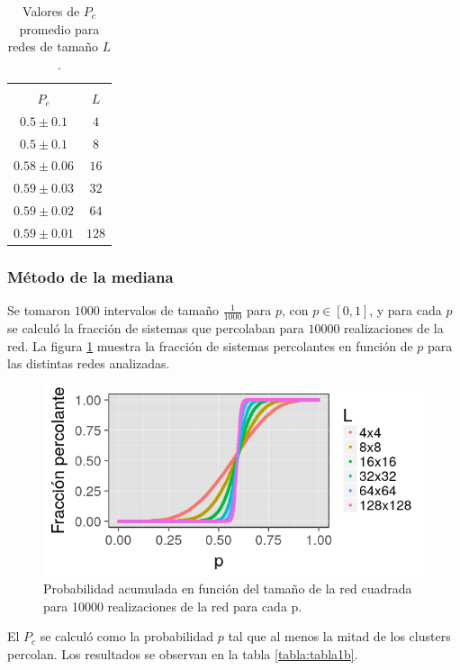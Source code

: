 \documentclass[%
 reprint,
 amsmath,amssymb,
 aps,
spanish]{revtex4-1}
\begin{document}
\begin{table}[h]
\caption{\label{tabla:tabla1a}Valores de $P_c$ promedio para redes de tamaño $L$.}
	\begin{tabular}{c|c}
		\hline
		\hline		
		\\[-5pt]
		$P_c$ & $L$ \\
		\hline
		$0.5\pm0.1$ & $4$ \\
		$0.5\pm0.1$ & $8$ \\
		$0.58\pm0.06$ & $16$ \\
		$0.59\pm0.03$ & $32$ \\
		$0.59\pm0.02$ & $64$ \\
		$0.59\pm0.01$ & $128$ \\															
	\end{tabular}
\end{table}

\subsubsection{Método de la mediana}
Se tomaron $1000$ intervalos de tamaño $\frac{1}{1000}$ para $p$, con $p \in [0, 1]$, y para cada $p$ se calculó la fracción de sistemas que percolaban para $10000$ realizaciones de la red. La figura \ref{fig:probabilidad_acumulada} muestra la fracción de sistemas percolantes en función de $p$ para las distintas redes analizadas. 
\begin{figure}[h!]
  \centering
  \includegraphics[width=.95\linewidth]{ej1b/probabilidad_acumulada}
\caption{Probabilidad acumulada en función del tamaño de la red cuadrada para 10000 realizaciones de la red para cada p.}
\label{fig:probabilidad_acumulada}
\end{figure}
El $P_c$ se calculó como la probabilidad $p$ tal que al menos la mitad de los clusters percolan. Los resultados se observan en la tabla \ref{tabla:tabla1b}.
\end{document}
